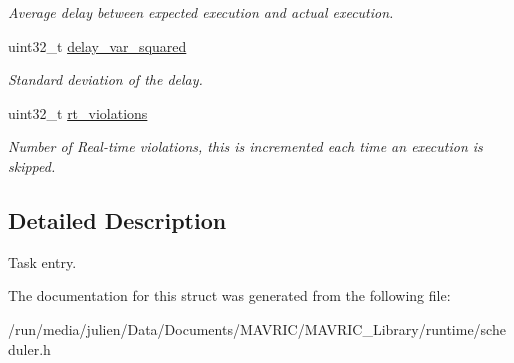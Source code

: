 \begin{DoxyCompactItemize}
\begin{DoxyCompactList}\small\item\em Average delay between expected execution and actual execution. \end{DoxyCompactList}\item 
\hypertarget{structtask__entry__t_a81b03276224954522a683ead0e036b5c}{uint32\+\_\+t \hyperlink{structtask__entry__t_a81b03276224954522a683ead0e036b5c}{delay\+\_\+var\+\_\+squared}}\label{structtask__entry__t_a81b03276224954522a683ead0e036b5c}

\begin{DoxyCompactList}\small\item\em Standard deviation of the delay. \end{DoxyCompactList}\item 
\hypertarget{structtask__entry__t_a15de8a27a56420dbe8d6c79c8fe795c3}{uint32\+\_\+t \hyperlink{structtask__entry__t_a15de8a27a56420dbe8d6c79c8fe795c3}{rt\+\_\+violations}}\label{structtask__entry__t_a15de8a27a56420dbe8d6c79c8fe795c3}

\begin{DoxyCompactList}\small\item\em Number of Real-\/time violations, this is incremented each time an execution is skipped. \end{DoxyCompactList}\end{DoxyCompactItemize}


\subsection{Detailed Description}
Task entry. 

The documentation for this struct was generated from the following file\+:\begin{DoxyCompactItemize}
\item 
/run/media/julien/\+Data/\+Documents/\+M\+A\+V\+R\+I\+C/\+M\+A\+V\+R\+I\+C\+\_\+\+Library/runtime/scheduler.\+h\end{DoxyCompactItemize}
